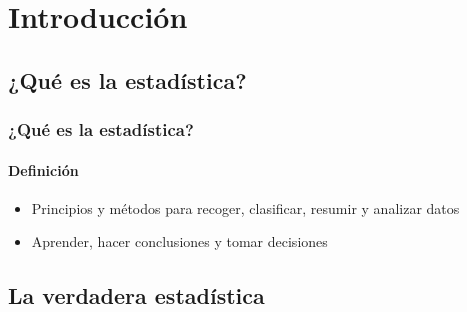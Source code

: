 \documentclass[mathserif]{beamer}
\begin{document}
\section{Introducci\'on}

\subsection[¿Qu\'e es?]{¿Qu\'e es la estad\'istica?}

\begin{frame}[label=def]
  \frametitle{¿Qu\'e es la estad\'istica?}
  \framesubtitle{Definici\'on}
  \begin{itemize}[<+-| handout:1>]
    \item Principios y m\'etodos para recoger, clasificar, resumir y analizar datos 
    \item Aprender, hacer conclusiones y tomar decisiones
  \end{itemize}
\end{frame}%


\subsection[La verdadera estad\'istica]{La verdadera estad\'istica}
\end{document}
